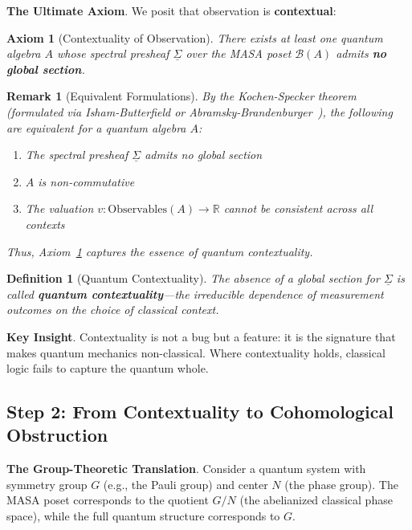 \documentclass[11pt]{article}
\newtheorem{definition}[theorem]{Definition}
\newtheorem{remark}[theorem]{Remark}
\newtheorem{axiom}[theorem]{Axiom}
\begin{document}
\textbf{The Ultimate Axiom}.
We posit that observation is \textbf{contextual}:

\begin{axiom}[Contextuality of Observation]
\label{axiom:contextuality}
There exists at least one quantum algebra $A$ whose spectral presheaf $\underline{\Sigma}$ over the MASA poset $\mathcal{B}(A)$ admits \textbf{no global section}.
\end{axiom}

\begin{remark}[Equivalent Formulations]
By the Kochen-Specker theorem (formulated via Isham-Butterfield or Abramsky-Brandenburger~\cite{Abramsky2011}), the following are equivalent for a quantum algebra $A$:
\begin{enumerate}
\item The spectral presheaf $\underline{\Sigma}$ admits no global section
\item $A$ is non-commutative
\item The valuation $v: \text{Observables}(A) \to \mathbb{R}$ cannot be consistent across all contexts
\end{enumerate}
Thus, Axiom~\ref{axiom:contextuality} captures the essence of quantum contextuality.
\end{remark}

\begin{definition}[Quantum Contextuality]
\label{def:quantum-contextuality}
The absence of a global section for $\underline{\Sigma}$ is called \textbf{quantum contextuality}---the irreducible dependence of measurement outcomes on the choice of classical context.
\end{definition}

\textbf{Key Insight}.
Contextuality is not a bug but a feature: it is the signature that makes quantum mechanics non-classical. Where contextuality holds, classical logic fails to capture the quantum whole.

\subsection{Step 2: From Contextuality to Cohomological Obstruction}
\label{step-2-cohomological-obstruction}

\textbf{The Group-Theoretic Translation}.
Consider a quantum system with symmetry group $G$ (e.g., the Pauli group) and center $N$ (the phase group). The MASA poset corresponds to the quotient $G/N$ (the abelianized classical phase space), while the full quantum structure corresponds to $G$.
\end{document}
